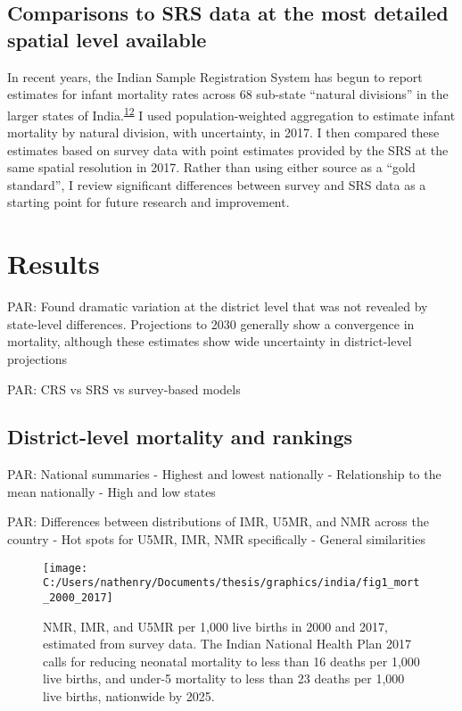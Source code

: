 \documentclass[
]{article}
\begin{document}
\hypertarget{comparisons-to-srs-data-at-the-most-detailed-spatial-level-available}{%
\subsection{Comparisons to SRS data at the most detailed spatial level available}\label{comparisons-to-srs-data-at-the-most-detailed-spatial-level-available}}

In recent years, the Indian Sample Registration System has begun to report estimates for infant mortality rates across 68 sub-state ``natural divisions'' in the larger states of India.\textsuperscript{\protect\hyperlink{ref-CensusofIndia2017}{12}} I used population-weighted aggregation to estimate infant mortality by natural division, with uncertainty, in 2017. I then compared these estimates based on survey data with point estimates provided by the SRS at the same spatial resolution in 2017. Rather than using either source as a ``gold standard'', I review significant differences between survey and SRS data as a starting point for future research and improvement.

\hypertarget{results}{%
\section{Results}\label{results}}

PAR: Found dramatic variation at the district level that was not revealed by state-level
differences. Projections to 2030 generally show a convergence in mortality, although
these estimates show wide uncertainty in district-level projections

PAR: CRS vs SRS vs survey-based models

\hypertarget{district-level-mortality-and-rankings}{%
\subsection{District-level mortality and rankings}\label{district-level-mortality-and-rankings}}

PAR: National summaries
- Highest and lowest nationally
- Relationship to the mean nationally
- High and low states

PAR: Differences between distributions of IMR, U5MR, and NMR across the country
- Hot spots for U5MR, IMR, NMR specifically
- General similarities

\begin{figure}[!hbt]

{\centering \texttt{[image: C:/Users/nathenry/Documents/thesis/graphics/india/fig1\_mort\_2000\_2017]} 

}

\caption{NMR, IMR, and U5MR per 1,000 live births in 2000 and 2017, estimated from survey data. The Indian National Health Plan 2017 calls for reducing neonatal mortality to less than 16 deaths per 1,000 live births, and under-5 mortality to less than 23 deaths per 1,000 live births, nationwide by 2025.}\label{fig:mort-summary}
\end{figure}
\end{document}
